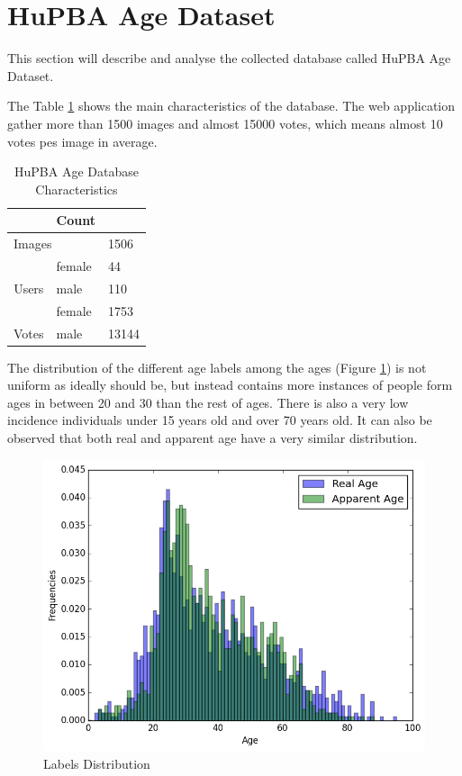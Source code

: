 \section{HuPBA Age Dataset}

This section will describe and analyse the collected database called HuPBA Age Dataset.

The Table \ref{tab:charact} shows the main characteristics of the database. The web application gather more than 1500 images and almost 15000 votes, which means almost 10 votes pes image in average.

\begin{table}[h]
	\centering
	\begin{tabular}{|c|l|l|}
		\rowcolor[HTML]{EFEFEF} 
		\hline
		\multicolumn{2}{|l|}{\cellcolor[HTML]{EFEFEF}\textbf{Features}} & Count \\ \hline
		\multicolumn{2}{|l|}{Images}                                    & 1506  \\ \hline
		& female                & 44    \\ \cline{2-3} 
		\multirow{-2}{*}{Users}                 & male                  & 110   \\ \hline
		& female                & 1753  \\ \cline{2-3} 
		\multirow{-2}{*}{Votes}                 & male                  & 13144 \\ \hline
	\end{tabular}
	\caption{HuPBA Age Database Characteristics}
	\label{tab:charact}
\end{table}
	
The distribution of the different age labels among the ages (Figure \ref{fig:distr}) is not uniform as ideally should be, but instead contains more instances of people form ages in between 20 and 30 than the rest of ages. There is also a very low incidence individuals under 15 years old and over 70 years old. It can also be observed that both real and apparent age have a very similar distribution.

\begin{figure}[h!]
	\centering
	\includegraphics[width=\textwidth]{figures/Label_Distribution}
	\caption{Labels Distribution}
	\label{fig:distr}
\end{figure}

